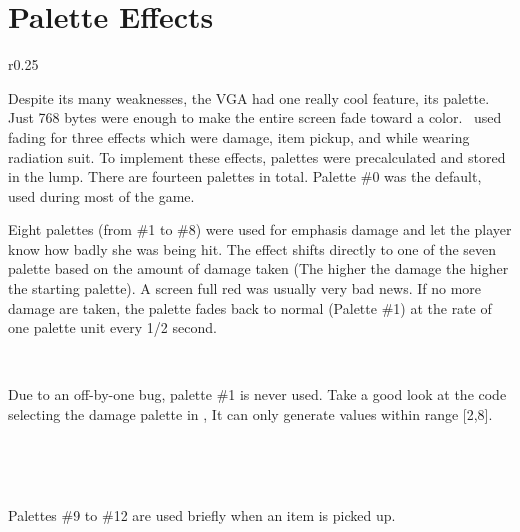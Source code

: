 \section{Palette Effects}
\label{label_palettes} \label{doom_palette}
\begin{wrapfigure}[8]{r}{0.25\textwidth}
\centering
{}
\end{wrapfigure}

Despite its many weaknesses, the VGA had one really cool feature, its palette. Just 768 bytes were enough to make the entire screen fade toward a color. \doom~used fading for three effects which were damage, item pickup, and while wearing radiation suit. To implement these effects, palettes were precalculated and stored in the  lump. There are fourteen palettes in total. Palette \#0 was the default, used during most of the game.\\
\par
Eight palettes (from \#1 to \#8) were used for emphasis damage and let the player know how badly she was being hit. The effect shifts directly to one of the seven palette based on the amount of damage taken (The higher the damage the higher the starting palette). A screen full red was usually very bad news. If no more damage are taken, the palette fades back to normal (Palette \#1) at the rate of one palette unit every 1/2 second.\\
\par
{}
\\
\par
Due to an off-by-one bug, palette \#1 is never used. Take a good look at the code selecting the damage palette in , It can only generate values within range [2,8].\\
\par
{}\\
\par
{}\\
\par
Palettes \#9 to \#12 are used briefly when an item is picked up.\\
\par
{}
